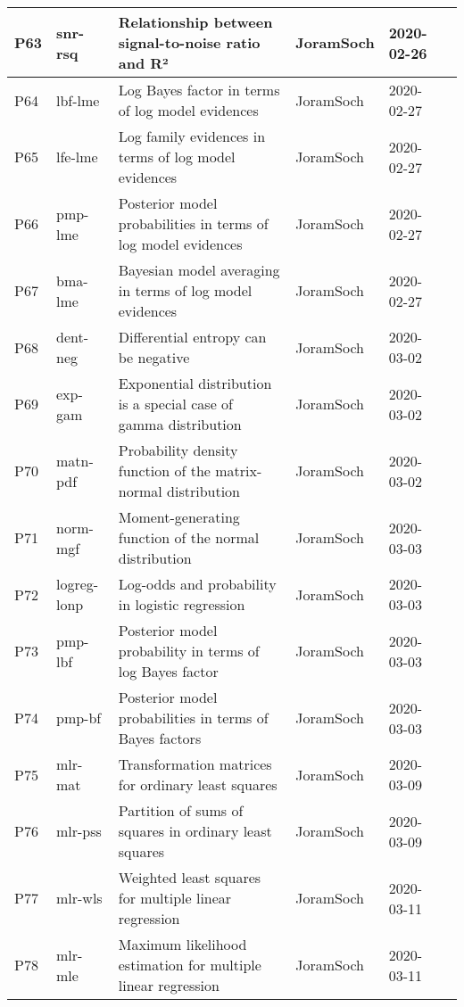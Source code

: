 \documentclass[a4paper,12pt,twoside]{book}
\begin{document}
\begin{longtable}{|p{1cm}|p{2cm}|p{6.5cm}|p{3cm}|p{2cm}|c|}
P63 & snr-rsq & Relationship between signal-to-noise ratio and R² & JoramSoch & 2020-02-26 & \pageref{sec:snr-rsq} \\ \hline
P64 & lbf-lme & Log Bayes factor in terms of log model evidences & JoramSoch & 2020-02-27 & \pageref{sec:lbf-lme} \\ \hline
P65 & lfe-lme & Log family evidences in terms of log model evidences & JoramSoch & 2020-02-27 & \pageref{sec:lfe-lme} \\ \hline
P66 & pmp-lme & Posterior model probabilities in terms of log model evidences & JoramSoch & 2020-02-27 & \pageref{sec:pmp-lme} \\ \hline
P67 & bma-lme & Bayesian model averaging in terms of log model evidences & JoramSoch & 2020-02-27 & \pageref{sec:bma-lme} \\ \hline
P68 & dent-neg & Differential entropy can be negative & JoramSoch & 2020-03-02 & \pageref{sec:dent-neg} \\ \hline
P69 & exp-gam & Exponential distribution is a special case of gamma distribution & JoramSoch & 2020-03-02 & \pageref{sec:exp-gam} \\ \hline
P70 & matn-pdf & Probability density function of the matrix-normal distribution & JoramSoch & 2020-03-02 & \pageref{sec:matn-pdf} \\ \hline
P71 & norm-mgf & Moment-generating function of the normal distribution & JoramSoch & 2020-03-03 & \pageref{sec:norm-mgf} \\ \hline
P72 & logreg-lonp & Log-odds and probability in logistic regression & JoramSoch & 2020-03-03 & \pageref{sec:logreg-lonp} \\ \hline
P73 & pmp-lbf & Posterior model probability in terms of log Bayes factor & JoramSoch & 2020-03-03 & \pageref{sec:pmp-lbf} \\ \hline
P74 & pmp-bf & Posterior model probabilities in terms of Bayes factors & JoramSoch & 2020-03-03 & \pageref{sec:pmp-bf} \\ \hline
P75 & mlr-mat & Transformation matrices for ordinary least squares & JoramSoch & 2020-03-09 & \pageref{sec:mlr-mat} \\ \hline
P76 & mlr-pss & Partition of sums of squares in ordinary least squares & JoramSoch & 2020-03-09 & \pageref{sec:mlr-pss} \\ \hline
P77 & mlr-wls & Weighted least squares for multiple linear regression & JoramSoch & 2020-03-11 & \pageref{sec:mlr-wls} \\ \hline
P78 & mlr-mle & Maximum likelihood estimation for multiple linear regression & JoramSoch & 2020-03-11 & \pageref{sec:mlr-mle} \\ \hline

\end{longtable}
\end{document}
